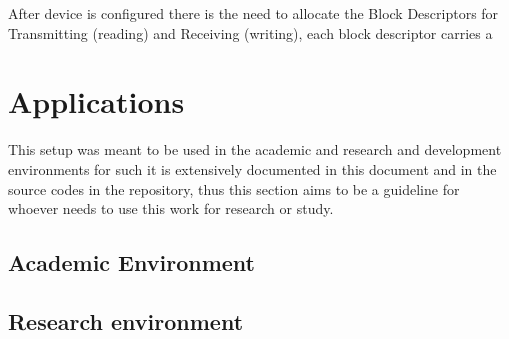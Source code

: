 After device is configured there is the need to allocate the Block Descriptors
for Transmitting (reading) and Receiving (writing), each block descriptor carries
a




\section{Applications}

This setup was meant to be used in the academic and research and development
environments for such it is extensively documented in this document and in the
source codes in the repository, thus this section aims to be a guideline for whoever needs to
use this work for research or study.

\subsection{Academic Environment}

\subsection{Research environment}
